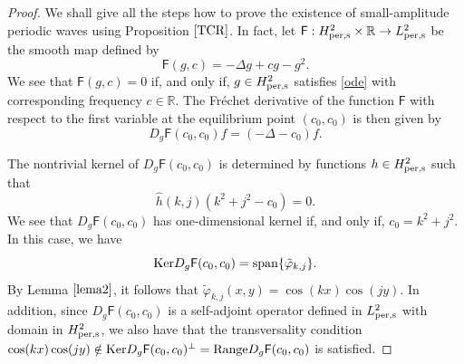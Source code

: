 \documentclass[12pt,reqno,a4paper]{amsart} %
\numberwithin{equation}{section}
\numberwithin{figure}{section}
\begin{document}
			\begin{proof} We shall give all the steps how to prove the existence of small-amplitude periodic waves using Proposition $\ref{TCR}$. In fact, let $\mathsf{F}: H_{\rm per,s}^{2} \times \mathbb{R} \rightarrow L_{\rm per,s}^2$ be the smooth map defined by
				\begin{equation}\label{F-lyapunov}
					\mathsf{F}(g,c) = -\Delta g+cg-g^2.
				\end{equation}
				 We see that $\mathsf{F}(g,c) = 0$ if, and only if, $g \in H_{\rm per,s}^{2}$ satisfies \eqref{ode} with corresponding frequency $c \in \mathbb{R}$. The Fr\'echet derivative of the function $\mathsf{F}$ with respect to the first variable at the equilibrium point $(c_0,c_0)$ is then given by
				\begin{equation}\label{Dg}
					D_g \mathsf{F}(c_0, c_0) f = (-\Delta - c_0) f.
				\end{equation}
				
				The nontrivial kernel of $D_g\mathsf{F}(c_0, c_0)$ is determined by functions $h \in H_{\rm per,s}^{2}$ such that
				\begin{equation}
					\widehat{h}(k,j) (k^2+j^2-c_0) = 0.
				\end{equation}
				We see that $D_g \mathsf{F}(c_0, c_0)$ has one-dimensional kernel if, and only if, $c_0 = k^2+j^2$. In this case, we have
				\begin{equation}
					{\rm Ker}D_g \mathsf{F}(c_0, c_0) = {\rm span}\{\tilde{\varphi}_{k,j}\}.
				\end{equation}
				By Lemma $\ref{lema2}$, it follows that $\tilde{\varphi}_{k,j}(x,y) = \cos(kx)\cos(jy)$. In addition, since $	D_g \mathsf{F}(c_0, c_0)$ is a self-adjoint operator defined in $L_{\rm per, s}^2$ with domain in $H_{\rm per, s}^2$, we also have that the transversality condition $\cos(kx)\cos(jy)\notin  {\rm Ker}D_g \mathsf{F}(c_0, c_0)^{\bot}={\rm Range}D_g \mathsf{F}(c_0, c_0)$ is satisfied. 
				

\end{proof}
\end{document}
